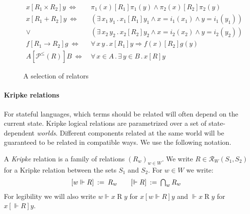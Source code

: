 \documentclass[acmsmall,authordraft]{acmart}
\newcommand{\ifr}[1]{\mathrel{[{#1}]}}
\begin{document}
\begin{figure} %
  \begin{align*}
    x \ifr{R_1 \times R_2} y \ \Leftrightarrow\  &
      \pi_1(x) \ifr{R_1} \pi_1(y) \wedge
      \pi_2(x) \ifr{R_2} \pi_2(y) \\
    x \ifr{R_1 + R_2} y \ \Leftrightarrow\  &
      (\exists \, x_1 \, y_1 \,.\,
        x_1 \ifr{R_1} y_1 \wedge
        x = i_1(x_1) \wedge
        y = i_1(y_1)) \\ \vee\ &
      (\exists \, x_2 \, y_2 \,.\,
        x_2 \ifr{R_2} y_2 \wedge
        x = i_2(x_2) \wedge
        y = i_2(y_2)) \\
    f \ifr{R_1 \rightarrow R_2} g \ \Leftrightarrow\  &
      \forall \, x \, y \,.\,
        x \ifr{R_1} y \Rightarrow
        f(x) \ifr{R_2} g(y) \\
    A \ifr{\mathcal{P}^\le(R)} B \ \Leftrightarrow\  &
      \forall \, x \in A \,.\,
      \exists \, y \in B \,.\,
      x \ifr{R} y
  \end{align*}
  \caption{A selection of relators}
  \label{fig:relators}
\end{figure}


\paragraph{Kripke relations}

For stateful languages,
which terms should be related
will often depend on the current state.
Kripke logical relations
are parametrized over a set of state-dependent \emph{worlds}.
Different components related at the same world
will be guaranteed to be related in compatible ways.
We use the following notation.

\begin{definition} \label{def:klr} %
A \emph{Kripke} relation is
a family of relations $(R_w)_{w \in W}$.
We write $R \in \mathcal{R}_W(S_1, S_2)$
for a Kripke relation between the sets $S_1$ and $S_2$.
For $w \in W$ we write:
\[
\begin{array}{c@{\qquad}c}
    [w \Vdash R] \: := \: R_w &
    [\Vdash R] \: := \: \bigcap_{w} R_w
\end{array}
\]
For legibility we will also write
$w \Vdash x \mathrel{R} y$ for $x \ifr{w \Vdash R} y$
and $\Vdash x \mathrel{R} y$ for $x \ifr{\Vdash R} y$.
\end{definition}
\end{document}
